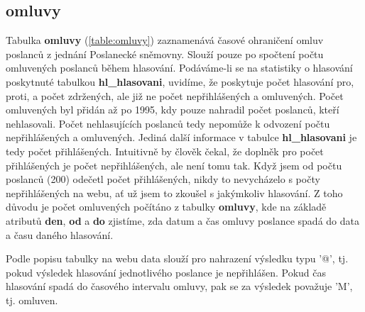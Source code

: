 \subsection*{omluvy}

Tabulka \textbf{omluvy} (\ref{table:omluvy}) zaznamenává časové ohraničení omluv poslanců z jednání Poslanecké sněmovny. Slouží pouze po spočtení počtu omluvených poslanců během hlasování. Podáváme-li se na statistiky o hlasování poskytnuté tabulkou \textbf{hl\_hlasovani}, uvidíme, že poskytuje počet hlasování pro, proti, a počet zdržených, ale již ne počet nepřihlášených a omluvených. Počet omluvených byl přidán až po 1995, kdy pouze nahradil počet poslanců, kteří nehlasovali. Počet nehlasujících poslanců tedy nepomůže k odvození počtu nepřihlášených a omluvených. Jediná další informace v tabulce \textbf{hl\_hlasovani} je tedy počet přihlášených. Intuitivně by člověk čekal, že doplněk pro počet přihlášených je počet nepřihlášených, ale není tomu tak. Když jsem od počtu poslanců (200) odečetl počet přihlášených, nikdy to nevycházelo s počty nepřihlášených na webu, ať už jsem to zkoušel s jakýmkoliv hlasování. Z toho důvodu je počet omluvených počítáno z tabulky \textbf{omluvy}, kde na základě atributů \textbf{den}, \textbf{od} a \textbf{do} zjistíme, zda datum a čas omluvy poslance spadá do data a času daného hlasování.

Podle popisu tabulky na webu data slouží pro nahrazení výsledku typu '@', tj. pokud výsledek hlasování jednotlivého poslance je nepřihlášen. Pokud čas hlasování spadá do časového intervalu omluvy, pak se za výsledek považuje 'M', tj. omluven.

